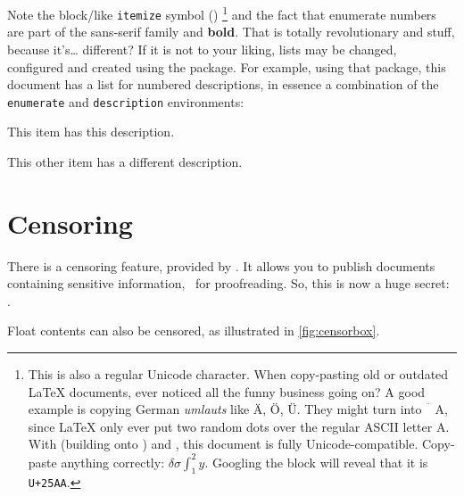 Note the block\-/like \texttt{itemize} symbol (\smblksquare{})%
\footnote{%
    This is also a regular Unicode character.
    When copy-pasting old or outdated \LaTeX{} documents, ever noticed all the
    funny business going on?
    A good example is copying German \emph{umlauts} like Ä, Ö, Ü.
    They might turn into \emph{\(\ddot{\phantom{A}}\text{A}\)}, since \LaTeX{}
    only ever put two random dots over the regular ASCII letter A.
    With  (building onto ) and
    , this document is fully Unicode-compatible.
    Copy-paste anything correctly: \(\delta \sigma \int_{1}^{2} y\).
    Googling the \smblksquare{} block will reveal that it is \texttt{U+25AA}.
}
and the fact that enumerate numbers are part of the {\sffamily sans-serif family}
and \textbf{bold}.
That is totally revolutionary and stuff, because it's\dots{} different?
If it is not to your liking, lists may be changed, configured and created using the
 package.
For example, using that package, this document has a list for numbered descriptions,
in essence a combination of the \verb|enumerate| and \verb|description| environments:
\begin{enumdescript}
    \item[This item] has this description.
    \item[This other item] has a different description.
\end{enumdescript}

\section{Censoring}

There is a censoring feature, provided by .
It allows you to publish documents containing sensitive information, \ for
proofreading.
So, this is now a huge
secret:
.

Float contents can also be censored, as illustrated in \cref{fig:censorbox}.
\begin{figure}
\end{figure}

